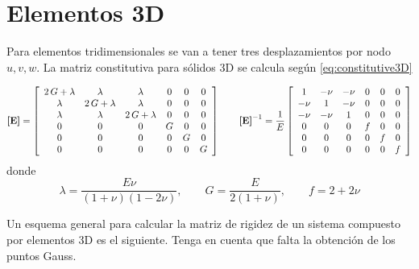 
\chapter{Elementos 3D}
Para elementos tridimensionales se van a tener tres desplazamientos por nodo $u,v,w$. La matriz constitutiva para sólidos 3D se calcula según \eqref{eq:constitutive3D}

\begin{equation} \label{eq:constitutive3D}
\boldsymbol{[}\mathbf{E} \boldsymbol{]} =\left[\begin{array}{cccccc} 2\,G+\lambda  & \lambda  & \lambda  & 0 & 0 & 0\\ \lambda  & 2\,G+\lambda  & \lambda  & 0 & 0 & 0\\ \lambda  & \lambda  & 2\,G+\lambda  & 0 & 0 & 0\\ 0 & 0 & 0 & G & 0 & 0\\ 0 & 0 & 0 & 0 & G & 0\\ 0 & 0 & 0 & 0 & 0 & G \end{array}\right] \qquad \boldsymbol{[}\mathbf{E} \boldsymbol{]}^{-1}=\frac{1}{E}\left[\begin{array}{cccccc} 1 & -\nu  & -\nu  & 0 & 0 & 0\\ -\nu  & 1 & -\nu  & 0 & 0 & 0\\ -\nu  & -\nu  & 1 & 0 & 0 & 0\\ 0 & 0 & 0 & f & 0 & 0\\ 0 & 0 & 0 & 0 & f & 0\\ 0 & 0 & 0 & 0 & 0 & f \end{array}\right]
\end{equation}
donde 
\[
\lambda = \frac{E \nu}{(1+\nu)(1-2\nu)}, \qquad  G=\frac{E}{2(1+\nu)}, \qquad f = 2+2\nu
\]

Un esquema general para calcular la matriz de rigidez de un sistema compuesto por elementos 3D es el siguiente. Tenga en cuenta que falta la obtención de los puntos Gauss.

